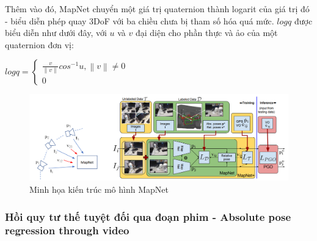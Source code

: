 Thêm vào đó, MapNet chuyển một giá trị quaternion thành logarit của giá trị đó - biểu diễn phép quay 3DoF với ba chiều chưa bị tham số hóa quá mức. $logq$ được biểu diễn như dưới đây, với $u$ và $v$ đại diện cho phần thực và ảo của một quaternion đơn vị:
\begin{center}
    $logq =
        \begin{cases}
            \frac{v}{\left \| v \right \|}cos^{-1}u, \left \| v \right \| \neq 0 \\
            0
        \end{cases}$
\end{center}
\begin{figure}[H]
    \centering
    \includegraphics[width=\textwidth]{pics/Chapter2/mapnet.png}
    \caption{Minh họa kiến trúc mô hình MapNet \cite{brahmbhatt2018geometryaware}}
\end{figure}

\subsubsection*{Hồi quy tư thế tuyệt đối qua đoạn phim - Absolute pose regression through video}

